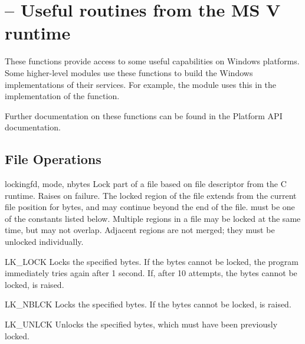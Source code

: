 \section{ --
         Useful routines from the MS V\Cpp{} runtime}



These functions provide access to some useful capabilities on Windows
platforms.  Some higher-level modules use these functions to build the 
Windows implementations of their services.  For example, the
 module uses this in the implementation of the
 function.

Further documentation on these functions can be found in the Platform
API documentation.


\subsection{File Operations \label{msvcrt-files}}

\begin{funcdesc}{locking}{fd, mode, nbytes}
  Lock part of a file based on file descriptor  from the C
  runtime.  Raises  on failure.  The locked region
  of the file extends from the current file position for 
  bytes, and may continue beyond the end of the file.   must
  be one of the  constants listed below.
  Multiple regions in a file may be locked at the same time, but may
  not overlap.  Adjacent regions are not merged; they must be unlocked
  individually.
\end{funcdesc}

\begin{datadesc}{LK_LOCK}
  Locks the specified bytes. If the bytes cannot be locked, the
  program immediately tries again after 1 second.  If, after 10
  attempts, the bytes cannot be locked,  is
  raised.
\end{datadesc}

\begin{datadesc}{LK_NBLCK}
  Locks the specified bytes. If the bytes cannot be locked,
   is raised.
\end{datadesc}

\begin{datadesc}{LK_UNLCK}
  Unlocks the specified bytes, which must have been previously locked. 
\end{datadesc}

